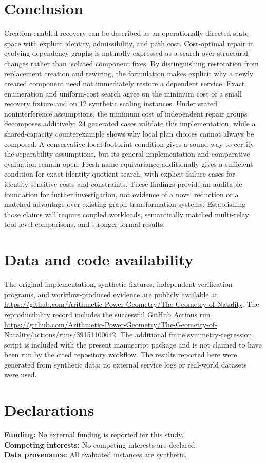 \documentclass[11pt,a4paper]{article}
\begin{document}
\section{Conclusion}
Creation-enabled recovery can be described as an operationally directed state space with explicit identity, admissibility, and path cost. Cost-optimal repair in evolving dependency graphs is naturally expressed as a search over structural changes rather than isolated component fixes. By distinguishing restoration from replacement creation and rewiring, the formulation makes explicit why a newly created component need not immediately restore a dependent service. Exact enumeration and uniform-cost search agree on the minimum cost of a small recovery fixture and on 12 synthetic scaling instances. Under stated noninterference assumptions, the minimum cost of independent repair groups decomposes additively; 24 generated cases validate this implementation, while a shared-capacity counterexample shows why local plan choices cannot always be composed. A conservative local-footprint condition gives a sound way to certify the separability assumptions, but its general implementation and comparative evaluation remain open. Fresh-name equivariance additionally gives a sufficient condition for exact identity-quotient search, with explicit failure cases for identity-sensitive costs and constraints. These findings provide an auditable foundation for further investigation, not evidence of a novel reduction or a matched advantage over existing graph-transformation systems. Establishing those claims will require coupled workloads, semantically matched multi-relay tool-level comparisons, and stronger formal results.

\section*{Data and code availability}
\begingroup\sloppy
The original implementation, synthetic fixtures, independent verification programs, and workflow-produced evidence are publicly available at \url{https://github.com/Arithmetic-Power-Geometry/The-Geometry-of-Natality}. The reproducibility record includes the successful GitHub Actions run \url{https://github.com/Arithmetic-Power-Geometry/The-Geometry-of-Natality/actions/runs/39151100642}. The additional finite symmetry-regression script is included with the present manuscript package and is not claimed to have been run by the cited repository workflow. The results reported here were generated from synthetic data; no external service logs or real-world datasets were used.

\endgroup
\section*{Declarations}
\noindent\textbf{Funding:} No external funding is reported for this study.\\
\textbf{Competing interests:} No competing interests are declared.\\
\textbf{Data provenance:} All evaluated instances are synthetic.

\printbibliography
\end{document}
